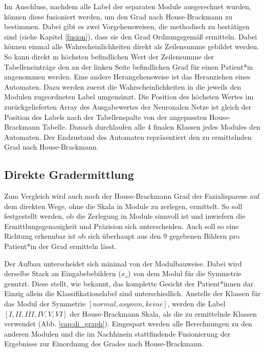 Im Anschluss, nachdem alle Label der separaten Module ausgerechnet wurden, können diese fusioniert werden, um den Grad nach House-Brackmann zu bestimmen. Dabei gibt es zwei Vorgehensweisen, die methodisch zu bestätigen sind (siehe Kapitel \ref{fusion}), dass sie den Grad Ordnungsgemäß ermitteln. Dabei können einmal alle Wahrscheinlichkeiten direkt als Zeilensumme gebildet werden. So kann direkt m höchsten befindlichen Wert der Zeilensumme der Tabelleneinträge den an der linken Seite befindlichen Grad für einen Patient*in angenommen werden. Eine andere Herangehensweise ist das Heranziehen eines Automaten. Dazu werden zuerst die Wahrscheinlichkeiten in die jeweils den Modulen zugeordneten Label umgemünzt. Die Position des höchsten Wertes im zurückgelieferten Array des Ausgabewertes der Neuronalen Netze ist gleich der Position des Labels nach der Tabellenspalte von der angepassten House-Brackmann Tabelle. Danach durchlaufen alle 4 finalen Klassen jedes Modules den Automaten. Der Endzustand des Automaten repräsentiert den zu ermittelnden Grad nach House-Brackmann.


\subsection{Direkte Gradermittlung}\label{di_module}
 Zum Vergleich wird auch noch der House-Brackmann Grad der Fazialisparese auf dem direkten Wege, ohne die Skala in Module zu zerlegen, ermittelt. So soll festgestellt werden, ob die Zerlegung in Module sinnvoll ist und inwiefern die Ermittlungsgenauigkeit und Präzision sich unterscheiden. Auch soll so eine Richtung erkennbar ist ob sich überhaupt aus den 9 gegebenen Bildern pro Patient*in der Grad ermitteln lässt.

\vspace{1cm}

 Der Aufbau unterscheidet sich minimal von der Modulbauweise. Dabei wird derselbe Stack an Eingabebebildern ($x_s$) von dem Modul für die Symmetrie genutzt. Diese stellt, wie bekannt, das komplette Gesicht der Patient*innen dar. Einzig allein die Klassifikationslabel sind unterschiedlich. Anstelle der Klassen für das Modul der Symmetrie $[normal, asymm, keine]$, werden die Label $[I, II, III, IV, V, VI]$ der House-Brackmann Skala, als die zu ermittelnde Klassen verwendet (Abb. \ref{cap:di_graph}). Eingespart werden alle Berechnungen zu den anderen Modulen und die im Nachhinein stattfindende Fusionierung der Ergebnisse zur Einordnung des Grades nach House-Brackmann.


